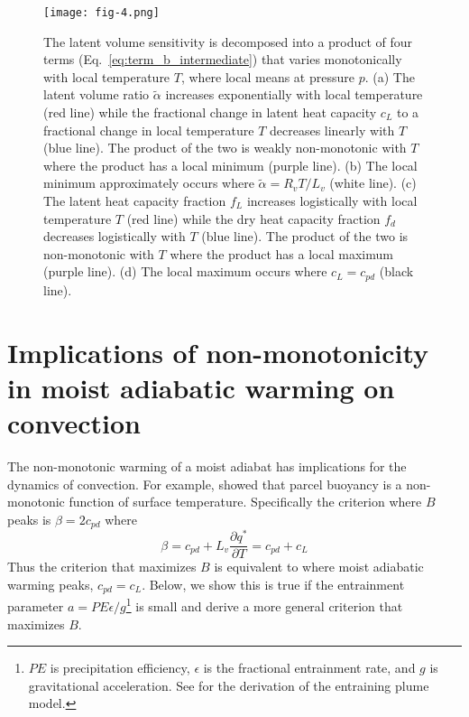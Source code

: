 \documentclass[draft]{ametsocV6.1}
\begin{document}
\begin{figure}[htbp]
 \centering
 \texttt{[image: fig-4.png]}\\
 \caption{The latent volume sensitivity is decomposed into a product of four terms (Eq.~\ref{eq:term_b_intermediate}) that varies monotonically with local temperature $T$, where local means at pressure $p$. (a) The latent volume ratio $\tilde{\alpha}$ increases exponentially with local temperature (red line) while the fractional change in latent heat capacity $c_L$ to a fractional change in local temperature $T$ decreases linearly with $T$ (blue line). The product of the two is weakly non-monotonic with $T$ where the product has a local minimum (purple line). (b) The local minimum approximately occurs where $\tilde{\alpha}= R_v T / L_v$ (white line). (c) The latent heat capacity fraction $f_L$ increases logistically with local temperature $T$ (red line) while the dry heat capacity fraction $f_d$ decreases logistically with $T$ (blue line). The product of the two is non-monotonic with $T$ where the product has a local maximum (purple line). (d) The local maximum occurs where $c_L=c_{pd}$ (black line).}\label{fig:fig-4}
\end{figure}


\section{Implications of non-monotonicity in moist adiabatic warming on convection}
The non-monotonic warming of a moist adiabat has implications for the dynamics of convection. For example, \cite{romps2016} showed that parcel buoyancy is a non-monotonic function of surface temperature. Specifically the criterion where $B$ peaks is $\beta = 2c_{pd}$ where
\begin{equation}
\beta = c_{pd} + L_v\frac{\partial q^*}{\partial T} = c_{pd} + c_L
\end{equation}
Thus the criterion that maximizes $B$ is equivalent to where moist adiabatic warming peaks, $c_{pd} = c_L$. Below, we show this is true if the entrainment parameter $a = PE \epsilon / g$\footnote{$PE$ is precipitation efficiency, $\epsilon$ is the fractional entrainment rate, and $g$ is gravitational acceleration. See \cite{romps2016} for the derivation of the entraining plume model.} is small and derive a more general criterion that maximizes $B$. 
\end{document}
